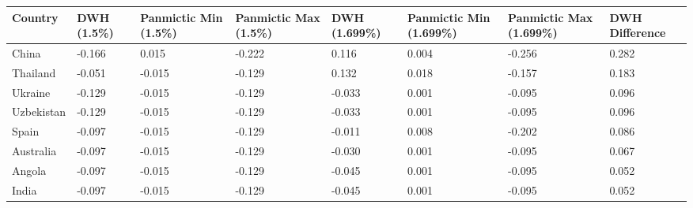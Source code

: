 \documentclass[utf8]{FrontiersinHarvard} %
\begin{document}
\begin{table}[h!]
	\centering
	\begin{tabularx}{\textwidth}{|l|X|X|X|X|X|X|X|}
		\hline
		\textbf{Country} & \textbf{DWH (1.5\%)} & \textbf{Panmictic Min (1.5\%)} & \textbf{Panmictic Max (1.5\%)} & \textbf{DWH (1.699\%)} & \textbf{Panmictic Min (1.699\%)} & \textbf{Panmictic Max (1.699\%)} & \textbf{DWH Difference} \\
		\hline
		China            & -0.166               & 0.015                          & -0.222                         & 0.116                  & 0.004                            & -0.256                           & 0.282                   \\
		Thailand         & -0.051               & -0.015                         & -0.129                         & 0.132                  & 0.018                            & -0.157                           & 0.183                   \\
		Ukraine          & -0.129               & -0.015                         & -0.129                         & -0.033                 & 0.001                            & -0.095                           & 0.096                   \\
		Uzbekistan       & -0.129               & -0.015                         & -0.129                         & -0.033                 & 0.001                            & -0.095                           & 0.096                   \\
		Spain            & -0.097               & -0.015                         & -0.129                         & -0.011                 & 0.008                            & -0.202                           & 0.086                   \\
		Australia        & -0.097               & -0.015                         & -0.129                         & -0.030                 & 0.001                            & -0.095                           & 0.067                   \\
		Angola           & -0.097               & -0.015                         & -0.129                         & -0.045                 & 0.001                            & -0.095                           & 0.052                   \\
		India            & -0.097               & -0.015                         & -0.129                         & -0.045                 & 0.001                            & -0.095                           & 0.052                   \\

\end{tabularx}
\end{table}
\end{document}

